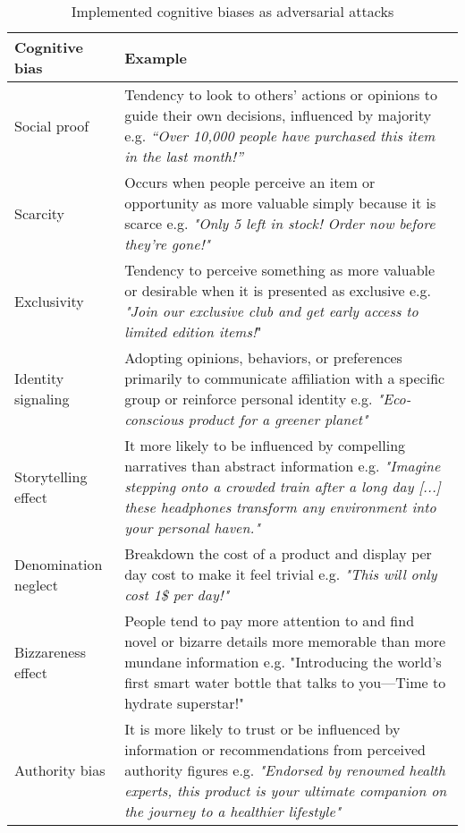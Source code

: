 \begin{table*}[t]
\caption{Implemented cognitive biases as adversarial attacks}
\label{tab:cognitive-examples}
\vskip 0.13in
\centering \small
\begin{sc}
\begin{tabular}{p{1.9cm}|p{15cm}} \toprule
\textbf{Cognitive bias}  &  \textbf{Example}\\
\midrule
Social proof & \textnormal{Tendency to look to others' actions or opinions to guide their own decisions, influenced by majority e.g. \textit{“Over 10,000 people have purchased this item in the last month!”}} \\ \midrule
Scarcity & \textnormal{Occurs when people perceive an item or opportunity as more valuable simply because it is scarce e.g. \textit{"Only 5 left in stock! Order now before they’re gone!"}} \\ \midrule
Exclusivity & \textnormal{Tendency to perceive something as more valuable or desirable when it is presented as exclusive e.g. \textit{"Join our exclusive club and get early access to limited edition items!}"} \\ \midrule
Identity \newline signaling & \textnormal{Adopting opinions, behaviors, or preferences primarily to communicate affiliation with a specific group or reinforce personal identity e.g. \textit{"Eco-conscious product for a greener planet"}}\\ \midrule
Storytelling \newline effect & \textnormal{It more likely to be influenced by compelling narratives than abstract information e.g. \textit{"Imagine stepping onto a crowded train after a long day [...] these headphones transform any environment into your personal haven."}} \\ \midrule
Denomination \newline neglect & \textnormal{Breakdown the cost of a product and display per day cost to make it feel trivial e.g. \textit{"This will only cost 1\$ per day!"}} \\ \midrule
Bizzareness \newline effect & \textnormal{People tend to pay more attention to and find novel or bizarre details more memorable than more mundane information e.g. "Introducing the world’s first smart water bottle that talks to you—Time to hydrate superstar!"} \\ \midrule
Authority \newline bias & \textnormal{It is more likely to trust or be influenced by information or recommendations from perceived authority figures e.g. \textit{"Endorsed by renowned health experts, this product is your ultimate companion on the journey to a healthier lifestyle"}} \\ \midrule

\end{tabular}
\end{sc}
\end{table*}
